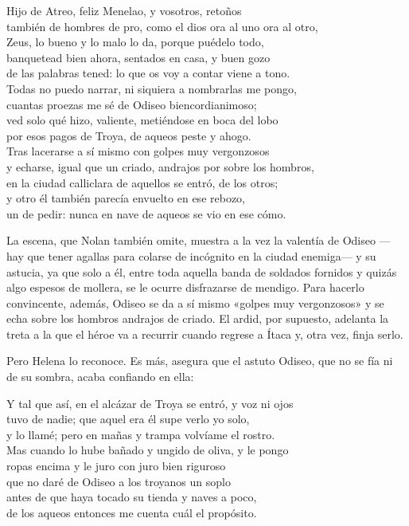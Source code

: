 \begin{versocita}
Hijo de Atreo, feliz Menelao, y vosotros, retoños\\
también de hombres de pro, como el dios ora al uno ora al otro,\\
Zeus, lo bueno y lo malo lo da, porque puédelo todo,\\
banquetead bien ahora, sentados en casa, y buen gozo\\
de las palabras tened: lo que os voy a contar viene a tono.\\
Todas no puedo narrar, ni siquiera a nombrarlas me pongo,\\
cuantas proezas me sé de Odiseo biencordianimoso;\\
ved solo qué hizo, valiente, metiéndose en boca del lobo\\
por esos pagos de Troya, de aqueos peste y ahogo.\\
Tras lacerarse a sí mismo con golpes muy vergonzosos\\
y echarse, igual que un criado, andrajos por sobre los hombros,\\
en la ciudad calliclara de aquellos se entró, de los otros;\\
y otro él también parecía envuelto en ese rebozo,\\
un de pedir: nunca en nave de aqueos se vio en ese cómo.
\end{versocita}

La escena, que Nolan también omite, muestra a la vez la valentía de Odiseo ---hay que tener agallas para colarse de incógnito en la ciudad enemiga--- y su astucia, ya que solo a él, entre toda aquella banda de soldados fornidos y quizás algo espesos de mollera, se le ocurre disfrazarse de mendigo. Para hacerlo convincente, además, Odiseo se da a sí mismo «golpes muy vergonzosos» y se echa sobre los hombros andrajos de criado. El ardid, por supuesto, adelanta la treta a la que el héroe va a recurrir cuando regrese a Ítaca y, otra vez, finja serlo.

Pero Helena lo reconoce. Es más, asegura que el astuto Odiseo, que no se fía ni de su sombra, acaba confiando en ella:

\begin{versocita}
Y tal que así, en el alcázar de Troya se entró, y voz ni ojos\\
tuvo de nadie; que aquel era él supe verlo yo solo,\\
y lo llamé; pero en mañas y trampa volvíame el rostro.\\
Mas cuando lo hube bañado y ungido de oliva, y le pongo\\
ropas encima y le juro con juro bien riguroso\\
que no daré de Odiseo a los troyanos un soplo\\
antes de que haya tocado su tienda y naves a poco,\\
de los aqueos entonces me cuenta cuál el propósito.
\end{versocita}

